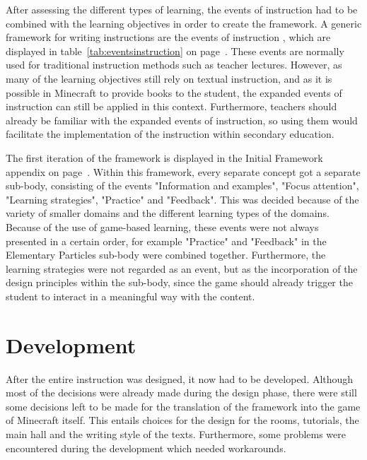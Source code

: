 \documentclass[11pt,twoside]{report} %
\begin{document}
After assessing the different types of learning, the events of instruction had to be combined with the learning objectives in order to create the framework. A generic framework for writing instructions are the events of instruction \cite{smithragan}, which are displayed in table~\ref{tab:eventsinstruction} on page~\pageref{tab:eventsinstruction}. These events are normally used for traditional instruction methods such as teacher lectures. However, as many of the learning objectives still rely on textual instruction, and as it is possible in Minecraft to provide books to the student, the expanded events of instruction can still be applied in this context. Furthermore, teachers should already be familiar with the expanded events of instruction, so using them would facilitate the implementation of the instruction within secondary education.

The first iteration of the framework is displayed in the Initial Framework appendix on page~\pageref{app:framework1}. Within this framework, every separate concept got a separate sub-body, consisting of the events "Information and examples", "Focus attention", "Learning strategies", "Practice" and "Feedback". This was decided because of the variety of smaller domains and the different learning types of the domains. Because of the use of game-based learning, these events were not always presented in a certain order, for example "Practice" and "Feedback" in the Elementary Particles sub-body were combined together. Furthermore, the learning strategies were not regarded as an event, but as the incorporation of the design principles within the sub-body, since the game should already trigger the student to interact in a meaningful way with the content.


\chapter{Development}
\thispagestyle{fancy}

After the entire instruction was designed, it now had to be developed. Although most of the decisions were already made during the design phase, there were still some decisions left to be made for the translation of the framework into the game of Minecraft itself. This entails choices for the design for the rooms, tutorials, the main hall and the writing style of the texts. Furthermore, some problems were encountered during the development which needed workarounds.
\end{document}
